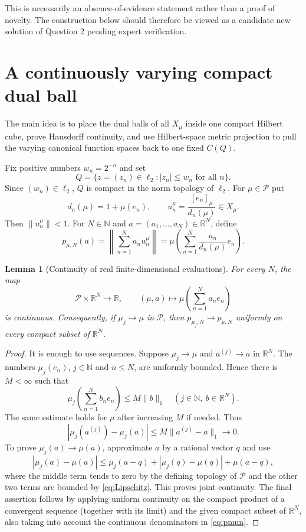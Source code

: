 \documentclass[11pt]{article}
\newtheorem{lemma}[theorem]{Lemma}
\theoremstyle{definition}
\newcommand{\Pcal}{\mathcal P}
\newcommand{\N}{\mathbb N}
\newcommand{\R}{\mathbb R}
\newcommand{\ellTwo}{\ell_2}
\begin{document}
This is necessarily an absence-of-evidence statement rather than a proof of
novelty.  The construction below should therefore be viewed as a candidate new
solution of Question 2 pending expert verification.

\section{A continuously varying compact dual ball}

The main idea is to place the dual balls of all $X_\mu$ inside one compact
Hilbert cube, prove Hausdorff continuity, and use Hilbert-space metric projection
to pull the varying canonical function spaces back to one fixed $C(Q)$.

Fix positive numbers $w_n=2^{-n}$ and set
\[
 Q=\{z=(z_n)\in\ellTwo: |z_n|\leq w_n\text{ for all }n\}.
 \tag{4.1}\label{eq:Q}
\]
Since $(w_n)\in\ellTwo$, $Q$ is compact in the norm topology of $\ellTwo$.
For $\mu\in\Pcal$ put
\[
 d_n(\mu)=1+\mu(e_n),\qquad
 u_n^\mu=\frac{[e_n]_\mu}{d_n(\mu)}\in X_\mu.
 \tag{4.2}\label{eq:normalized}
\]
Then $\|u_n^\mu\|<1$.  For $N\in\N$ and $a=(a_1,\ldots,a_N)\in\R^N$, define
\[
 p_{\mu,N}(a)
 =\left\|\sum_{n=1}^N a_nu_n^\mu\right\|
 =\mu\left(\sum_{n=1}^N\frac{a_n}{d_n(\mu)}e_n\right).
 \tag{4.3}\label{eq:pmun}
\]

\begin{lemma}[Continuity of real finite-dimensional evaluations]
\label{lem:finite-eval}
For every $N$, the map
\[
 \Pcal\times\R^N\longrightarrow\R,
 \qquad
 (\mu,a)\longmapsto\mu\left(\sum_{n=1}^N a_ne_n\right)
\]
is continuous.  Consequently, if $\mu_j\to\mu$ in $\Pcal$, then
$p_{\mu_j,N}\to p_{\mu,N}$ uniformly on every compact subset of $\R^N$.
\end{lemma}

\begin{proof}
It is enough to use sequences.  Suppose $\mu_j\to\mu$ and $a^{(j)}\to a$ in
$\R^N$.  The numbers $\mu_j(e_n)$, $j\in\N$ and $n\leq N$, are uniformly
bounded.  Hence there is $M<\infty$ such that
\[
 \mu_j\left(\sum_{n=1}^N b_ne_n\right)\leq M\|b\|_1
 \quad(j\in\N,\ b\in\R^N).
 \tag{4.4}\label{eq:Lipschitz}
\]
The same estimate holds for $\mu$ after increasing $M$ if needed.  Thus
\[
 |\mu_j(a^{(j)})-\mu_j(a)|\leq M\|a^{(j)}-a\|_1\longrightarrow0.
\]
To prove $\mu_j(a)\to\mu(a)$, approximate $a$ by a rational vector $q$ and use
\[
 |\mu_j(a)-\mu(a)|
 \leq \mu_j(a-q)+|\mu_j(q)-\mu(q)|+\mu(a-q),
\]
where the middle term tends to zero by the defining topology of $\Pcal$ and the
other two terms are bounded by \eqref{eq:Lipschitz}.  This proves joint
continuity.  The final assertion follows by applying uniform continuity on the
compact product of a convergent sequence (together with its limit) and the given
compact subset of $\R^N$, also taking into account the continuous denominators
in \eqref{eq:pmun}.
\end{proof}
\end{document}
